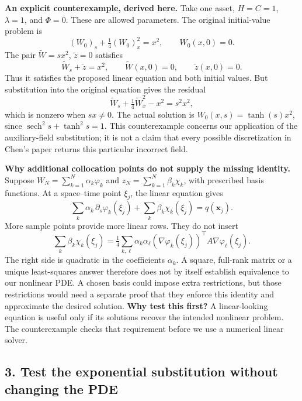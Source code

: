 \textbf{An explicit counterexample, derived here.}
Take one asset, $H=C=1$, $\lambda=1$, and $\Phi=0$. These are allowed
parameters. The original initial-value problem is
\[
 (W_0)_s+\tfrac14(W_0)_x^2=x^2,\qquad W_0(x,0)=0.
\]
The pair $\widetilde W=sx^2$, $\widetilde z=0$ satisfies
\[
 \widetilde W_s+\widetilde z=x^2,\qquad
 \widetilde W(x,0)=0,\qquad\widetilde z(x,0)=0.
\]
Thus it satisfies the proposed linear equation and both initial values.
But substitution into the original equation gives the residual
\begin{equation}
 \widetilde W_s+\tfrac14\widetilde W_x^2-x^2=s^2x^2,
 \label{eq:stage4-counterexample}
\end{equation}
which is nonzero when $s x\ne0$. The actual solution is
$W_0(x,s)=\tanh(s)x^2$, since
$\operatorname{sech}^2s+\tanh^2s=1$.
This counterexample concerns our application of the auxiliary-field
substitution; it is not a claim that every possible discretization in
Chen's paper returns this particular incorrect field.

\textbf{Why additional collocation points do not supply the missing
identity.} Suppose
$W_N=\sum_{k=1}^N\alpha_k\varphi_k$ and
$z_N=\sum_{k=1}^N\beta_k\chi_k$, with prescribed basis functions.
At a space--time point $\xi_j$, the linear equation gives
\[
 \sum_k\alpha_k\,\partial_s\varphi_k(\xi_j)
 +\sum_k\beta_k\chi_k(\xi_j)=q(\mathbf x_j).
\]
More sample points provide more linear rows. They do not insert
\[
 \sum_k\beta_k\chi_k(\xi_j)=
 \tfrac14\sum_{k,\ell}\alpha_k\alpha_\ell
 (\nabla\varphi_k(\xi_j))^\top A\nabla\varphi_\ell(\xi_j).
\]
The right side is quadratic in the coefficients $\alpha_k$. A square,
full-rank matrix or a unique least-squares answer therefore does not by
itself establish equivalence to our nonlinear PDE. A chosen basis could
impose extra restrictions, but those restrictions would need a separate
proof that they enforce this identity and approximate the desired solution.
\textbf{Why test this first?} A linear-looking equation is useful only if
its solutions recover the intended nonlinear problem. The counterexample
checks that requirement before we use a numerical linear solver.

\subsection*{3. Test the exponential substitution without changing the PDE}

